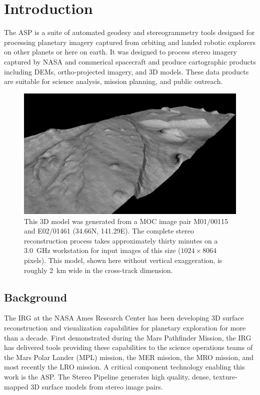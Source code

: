 \chapter{Introduction}

\acresetall

The  \ac{ASP} is a suite of automated geodesy and
stereogrammetry tools designed for processing planetary imagery
captured from orbiting and landed robotic explorers on other planets
or here on earth.  It was designed to process stereo imagery captured
by \ac{NASA} and commerical spacecraft and produce cartographic
products including \acp{DEM}, ortho-projected imagery, and 3D models.
These data products are suitable for science analysis, mission
planning, and public outreach.

\begin{figure}[tb]
   \centering
   \includegraphics[width=6.5in]{images/introduction/p19view2.png}
   \caption{This 3D model was generated from a \acf{MOC} image
     pair M01/00115 and E02/01461 (34.66N, 141.29E).  The complete
     stereo reconstruction process takes approximately thirty minutes on
     a 3.0~GHz workstation for input images of this size ($1024 \times 8064$
     pixels).  This model, shown here without vertical
     exaggeration, is roughly 2~km wide in the cross-track
     dimension. }
   \label{fig:p19}
\end{figure}

\section{Background}

The \ac{IRG} at the NASA Ames Research Center has been developing
3D surface reconstruction and visualization capabilities for planetary
exploration for more than a decade.  First demonstrated during the
Mars Pathfinder Mission, the \ac{IRG} has delivered tools providing
these capabilities to the science operations teams of the Mars Polar
Lander (MPL) mission, the \ac{MER} mission, the \ac{MRO} mission,
and most recently the \ac{LRO} mission. A critical component
technology enabling this work is the \acf{ASP}.  The Stereo Pipeline
generates high quality, dense, texture-mapped 3D surface models
from stereo image pairs.

